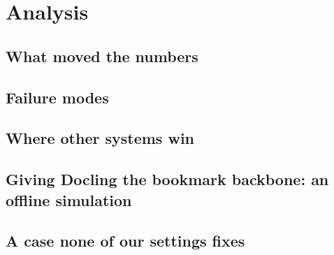 \section{Analysis}
\label{sec:analysis}
\subsection{What moved the numbers}\label{sec:what-moved}
\begin{table}[t]\centering
  \caption{Development changes and their effects.}\label{tab:changes}
\end{table}
\subsection{Failure modes}\label{sec:failures}
\subsection{Where other systems win}\label{sec:others-win}
\subsection{Giving Docling the bookmark backbone: an offline simulation}\label{sec:docling-bookmarks}
\begin{table}[t]\centering
  \caption{Bookmark reconciliation for Docling: change in Heading Tree TEDS (arXiv / GitHub).}\label{tab:bookmarks}
\end{table}
\subsection{A case none of our settings fixes}\label{sec:ipcc}
